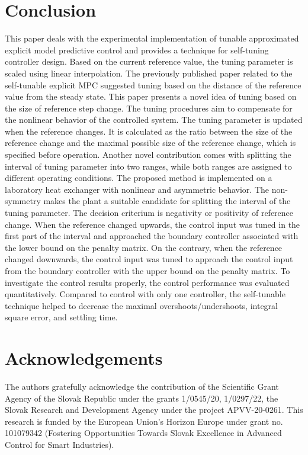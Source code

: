 \documentclass[preprint,12pt]{elsarticle}
\begin{document}
\section{Conclusion}
\label{sec:conclusion}
This paper deals with the experimental implementation of tunable approximated explicit model predictive control and provides a technique for self-tuning controller design. Based on the current reference value, the tuning parameter is scaled using linear interpolation. The previously published paper related to the self-tunable explicit MPC suggested tuning based on the distance of the reference value from the steady state. This paper presents a novel idea of tuning based on the size of reference step change. The tuning procedures aim to compensate for the nonlinear behavior of the controlled system. The tuning parameter is updated when the reference changes. It is calculated as the ratio between the size of the reference change and the maximal possible size of the reference change, which is specified before operation. Another novel contribution comes with splitting the interval of tuning parameter into two ranges, while both ranges are assigned to different operating conditions. The proposed method is implemented on a laboratory heat exchanger with nonlinear and asymmetric behavior. The non-symmetry makes the plant a suitable candidate for splitting the interval of the tuning parameter. The decision criterium is negativity or positivity of reference change. When the reference changed upwards, the control input was tuned in the first part of the interval and approached the boundary controller associated with the lower bound on the penalty matrix. On the contrary, when the reference changed downwards, the control input was tuned to approach the control input from the boundary controller with the upper bound on the penalty matrix. To investigate the control results properly, the control performance was evaluated quantitatively. Compared to control with only one controller, the self-tunable technique helped to decrease the maximal overshoots/undershoots, integral square error, and settling time.

\section*{Acknowledgements}

The authors gratefully acknowledge the contribution of the Scientific Grant Agency of the Slovak Republic under the grants 1/0545/20, 1/0297/22, the Slovak Research and Development Agency under the project APVV-20-0261. 
This research is funded by the European Union’s Horizon Europe under grant no. 101079342 (Fostering Opportunities Towards Slovak Excellence in Advanced Control for Smart Industries). 
\end{document}
